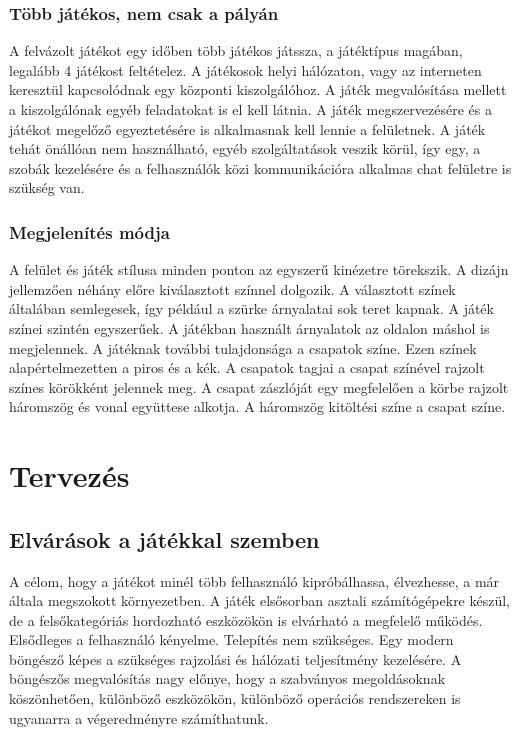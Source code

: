 \documentclass[bibliography=totocnumbered]{article}
\begin{document}
\subsubsection{Több játékos, nem csak a
pályán}

A felvázolt játékot egy időben több játékos játssza, a játéktípus
magában, legalább 4 játékost feltételez. A játékosok helyi hálózaton,
vagy az interneten keresztül kapcsolódnak egy központi kiszolgálóhoz. A
játék megvalósítása mellett a kiszolgálónak egyéb feladatokat is el kell
látnia. A játék megszervezésére és a játékot megelőző egyeztetésére is
alkalmasnak kell lennie a felületnek. A játék tehát önállóan nem
használható, egyéb szolgáltatások veszik körül, így egy, a szobák
kezelésére és a felhasználók közi kommunikációra alkalmas chat felületre
is szükség van.


\subsubsection{Megjelenítés módja}

A felület és játék stílusa minden ponton az egyszerű kinézetre
törekszik. A dizájn jellemzően néhány előre kiválasztott színnel
dolgozik. A választott színek általában semlegesek, így például a szürke
árnyalatai sok teret kapnak. A játék színei szintén egyszerűek. A
játékban használt árnyalatok az oldalon máshol is megjelennek. A
játéknak további tulajdonsága a csapatok színe. Ezen színek
alapértelmezetten a piros és a kék. A csapatok tagjai a csapat színével
rajzolt színes körökként jelennek meg. A csapat zászlóját egy
megfelelően a körbe rajzolt háromszög és vonal együttese alkotja. A
háromszög kitöltési színe a csapat színe.


\section{Tervezés}


\subsection{Elvárások a játékkal
szemben}

A célom, hogy a játékot minél több felhasználó kipróbálhassa,
élvezhesse, a már általa megszokott környezetben. A játék elsősorban
asztali számítógépekre készül, de a felsőkategóriás hordozható
eszközökön is elvárható a megfelelő működés. Elsődleges a felhasználó
kényelme. Telepítés nem szükséges. Egy modern böngésző képes a szükséges
rajzolási és hálózati teljesítmény kezelésére. A böngészős megvalósítás
nagy előnye, hogy a szabványos megoldásoknak köszönhetően, különböző
eszközökön, különböző operációs rendszereken is ugyanarra a
végeredményre számíthatunk.
\end{document}

